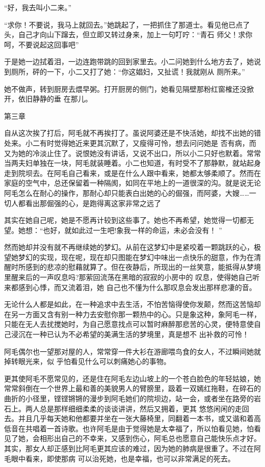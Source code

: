 \documentclass{article}
\begin{document}
“好，我去叫小二来。” 

“求你！不要说，我马上就回去。”她跳起了，一把抓住了那道士。看见他已点了头，自己才向山下蹿去，但立即又转过身来，加上一句叮咛：“青石
师父！求你呵，不要说起这回事吧” 

于是她一边拭着泪，一边连跑带跳的回到家里去。小二问她到什么地方去了，她说到厕所，砰的一下，小二又打了她：“你这娼妇，又扯谎！我就刚从
厕所来。” 

她不做声，转到厨房去煨早粥。打开厨房的侧门，她看见隔壁那粉红窗榷还没掀开，依旧静静的垂
在那儿。 


第三章 


自从这次挨了打后，阿毛就不再挨打了。虽说阿婆还是不快活她，却找不出她的错处来。小二有时觉得她近来更其沉默了，又瘦得可怜，想去问问她是
\newpage
否有病，而又为她的冷淡止住了。说恨她没有讲话，又说不出口，所以小二只好也默着。常常当两夫妇单独在一块，阿毛就装睡着。小二也知道，有时受不了那静默，就站起身走到院坝去。在阿毛自己看来，或是在什么人跟中看来，她都太够柔顺了。然而在家庭的空气中，总还保留着一种隔阂，如同在平地上的一道很深的沟。就是说无论阿毛怎么在耐心的操作，那耐心却只能表白出她的心的倔强，而阿婆，大嫂……一切人都看出那倔强的心，是跑得离这家非常之远了

其实在她自己呢，她是不愿再计较到这些事了。她也不再希望，她觉得一切都无望。她想：“也好，就如此过一生吧!象我一样的命运，未必会没有！
” 

然而她却并没有就不再继续她的梦幻。从前在这梦幻中是紧咬着一颗跳跃的心，极望她梦幻的实现，现在呢，现在却只图能在梦幻中味出一点快乐的甜意，作为在清醒时所感到的悲凉的慰藉就算了。但在夜静后，所现出的一丝笑意，能抵得从梦境里醒来后的一声叹息吗?那萦回流荡在黑暗的寂寂的小房中的
\newpage
叹息，使得她自己听来都感到心悸，而又流着泪，她
自己也不懂为什么那叹息会发出那样悲凄的音。 

无论什么人都是如此，在一种追求中去生活，不怕苦恼得使你发颠，然而这苦恼却在另一方面又含有别一种力去安慰你那一颗热中的心。只是象这种，象阿毛一样，只能在无人去扰搅她时，为自己愿意找点可以暂时麻醉那悲苦的心灵，便特意使自己浸沉在一种已认为不必希望的美满生活的梦境里，真是想不
出补救的可怜！ 

阿毛偶尔也一望那对屋的人，常常穿一件大衫在游廊喂鸟食的女人，不过瞬间她就掉转眼光来，似
乎怕看见什么可以刺痛她心的事物。 

更其使阿毛不愿常见的，还是住在阿毛左边山坡上的一个苍白脸色的年轻姑娘，她常常斜倒在一个世界上最和善的美貌男人的臂膀里，趿着一双嫣红拖鞋，在碎石的曲折的小径里，铿铿锵锵的漫步到阿毛她们的院坝边，站一会，或者坐在路旁的岩石上。两人总是那样细细柔柔的谈谈讲讲，然后又拥着，更其
\newpage
悠悠闲闲的走回去。并且几乎每天她和他都要并坐在一张大藤椅里，同翻着一本书，或又谐和着高低音在共唱着一首诗歌。也许阿毛是由于觉得她是太幸福了，所以怕看见她，怕看见了她，会相形出自己的不幸来，又感到伤心，阿毛总也愿意自己能快乐点才好。其实，那女人却正感到比阿毛更其应该的难过，因为她的肺病是很重了。不过在阿毛眼中看来，即使那病
可以治死她，也是幸福，也可以非常满足的死去。 
\end{document}
